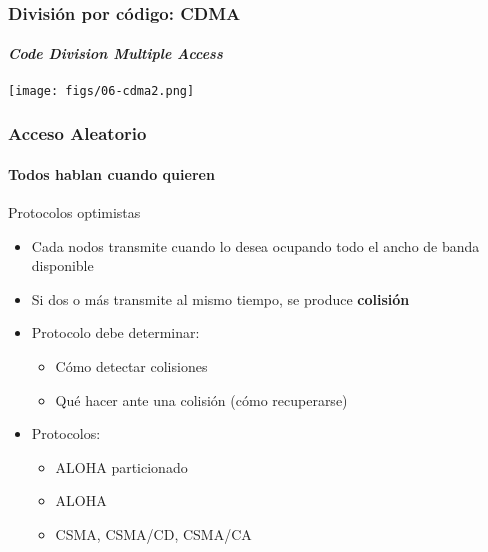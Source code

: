 \documentclass[letter]{beamer}
\begin{document}
\begin{frame}
  \frametitle{División por código: CDMA}
  \framesubtitle{{\em Code Division Multiple Access}}

  \begin{center}
    \texttt{[image: figs/06-cdma2.png]}
  \end{center}

\end{frame}
\begin{frame}
  \frametitle{Acceso Aleatorio}
  \framesubtitle{Todos hablan cuando quieren}

  Protocolos optimistas
  \begin{itemize}
    \item Cada nodos transmite cuando lo desea ocupando todo el ancho de banda disponible
    \item Si dos o más transmite al mismo tiempo, se produce {\bf colisión}
    \item Protocolo debe determinar:
      \begin{itemize}
        \item Cómo detectar colisiones
        \item Qué hacer ante una colisión (cómo recuperarse)
      \end{itemize}
    \item Protocolos:
      \begin{itemize}
        \item ALOHA particionado
        \item ALOHA
        \item CSMA, CSMA/CD, CSMA/CA
      \end{itemize}
  \end{itemize}

\end{frame}
\end{document}
